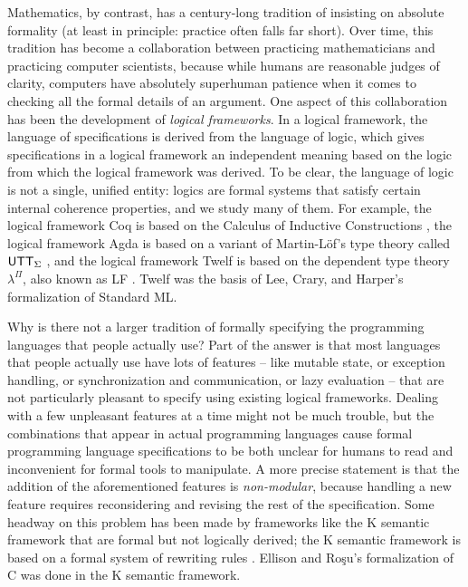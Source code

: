 Mathematics, by contrast, has a century-long tradition of insisting on
absolute formality (at least in principle: practice often falls far
short).
%
Over time, this tradition has become a collaboration between
practicing mathematicians and practicing computer scientists, because
while humans are reasonable judges of clarity, computers have
absolutely superhuman patience when it comes to checking all the
formal details of an argument.
%
One aspect of
this collaboration has been the development of {\it logical
  frameworks}. In a logical framework, the language of specifications
is derived from the language of logic, which gives specifications in a
logical framework an independent meaning based on the logic from which
the logical framework was derived. To be clear, the language of logic
is not a single, unified entity: logics are formal systems that
satisfy certain internal coherence properties, and we study many of
them. For example, the logical framework Coq is based on the Calculus
of Inductive Constructions \cite{coq10coq}, the logical framework Agda
is based on a variant of Martin-L\"of's type theory called ${\sf
  UTT}_\Sigma$ \cite{norell08towards}, and the logical framework
Twelf is based
on the dependent type theory $\lambda^\Pi$, also known as LF
\cite{pfenning99system}. Twelf was the basis of Lee, Crary, and
Harper's formalization of Standard ML.  %

Why is there not a larger tradition of formally specifying the
programming languages that people actually use? Part of the answer is
that most languages that people actually use have lots of features --
like mutable state, or exception handling, or synchronization and
communication, or lazy evaluation -- that are not particularly
pleasant to specify using existing logical frameworks. Dealing with a
few unpleasant features at a time might not be much trouble, but the
combinations that appear in actual programming languages cause formal
programming language specifications to be both unclear for humans to
read and inconvenient for formal tools to manipulate. A more precise
statement is that the addition of the aforementioned features is {\it
  non-modular}, because handling a new feature requires reconsidering
and revising the rest of the specification.  Some headway on this
problem has been made by frameworks like the K semantic framework that
are formal but not logically derived; the K semantic framework is
based on a formal system 
of rewriting rules \cite{rosu10overview}. Ellison
and Ro\c{s}u's formalization of C was done in the K semantic
framework.

